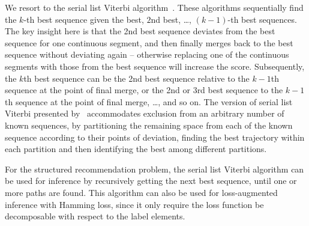 We resort to the serial list Viterbi algorithm~\cite{seshadri1994list}. 
These algorithms sequentially find the $k$-th best sequence given the best, $2$nd best, \dots, $(k-1)$-th best sequences. 
The key insight here is that the 2nd best sequence deviates from the best sequence
for one continuous segment, and then finally merges back to the best sequence without deviating again 
-- otherwise replacing one of the continuous segments with those from the best sequence will increase the score. 
Subsequently, the $k$th best sequence can be the 2nd best sequence relative to the $k-1$th sequence 
at the point of final merge, or the 2nd or 3rd best sequence to the $k-1$th sequence at the point of final merge, \ldots, and so on. 
The version of serial list Viterbi presented by~\cite{nilsson2001sequentially} accommodates 
exclusion from an arbitrary number of known sequences, by partitioning the remaining space 
from each of the known sequence according to their points of deviation, 
finding the best trajectory within each partition and then identifying the best among different partitions. 

For the structured recommendation problem, the serial list Viterbi algorithm can be used for inference 
by recursively getting the next best sequence, until one or more paths are found. 
This algorithm can also be used for loss-augmented inference with Hamming loss, 
since it only require the loss function be decomposable with respect to the label elements. 

